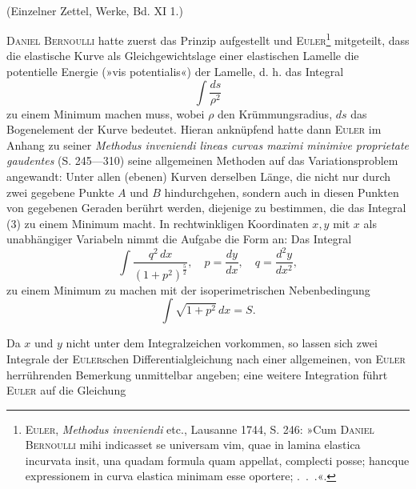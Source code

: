 \clearpage\begingroup\NoSourceHead{}
\renewcommand{\thefootnote}{\arabic{footnote})}\setcounter{footnote}{2}
\begin{center}\\
\small (Einzelner Zettel, Werke, Bd. XI 1.)\end{center}
\noindent\hspace*{\parindent}\textsc{Daniel Bernoulli} hatte zuerst das Prinzip aufgestellt und \textsc{Euler}\footnote{\textsc{Euler}, \textit{Methodus inveniendi} etc., Lausanne 1744, S. 246: »Cum \textsc{Daniel Bernoulli} mihi indicasset
se universam vim, quae in lamina elastica incurvata insit, una quadam formula quam 
appellat, complecti posse; hancque expressionem in curva elastica minimam esse oportere; .\ .\ .«.} mitgeteilt, dass die elastische Kurve als Gleichgewichtslage einer elastischen Lamelle die potentielle Energie (»vis potentialis«) der Lamelle, d. h. das Integral
\begin{equation*}\tag{3}
\int\frac{ds}{\rho^2}
\end{equation*}
zu einem Minimum machen muss, wobei $\rho$ den Krümmungsradius, $ds$ das
\clearpage{}
\noindent Bogenelement der Kurve bedeutet. Hieran anknüpfend hatte dann \textsc{Euler} im
Anhang zu seiner \textit{Methodus inveniendi lineas curvas maximi minimive proprietate
gaudentes} (S. 245—310) seine allgemeinen Methoden auf das Variationsproblem
angewandt: Unter allen (ebenen) Kurven derselben Länge, die nicht nur durch
zwei gegebene Punkte $A$ und $B$ hindurchgehen, sondern auch in diesen
Punkten von gegebenen Geraden berührt werden, diejenige zu bestimmen, die
das Integral (3) zu einem Minimum macht. In rechtwinkligen Koordinaten
$x,y$ mit $x$ als unabhängiger Variabeln nimmt die Aufgabe die Form an: Das
Integral
\[
\int\frac{q^2\,dx}{(1+p^2)^{\frac52}},\quad p=\frac{dy}{dx},\quad q=\frac{d^2y}{dx^2},
\]
zu einem Minimum zu machen mit der isoperimetrischen Nebenbedingung
\[
\int\sqrt{1+p^2}\,dx=S.
\]
\par\noindent\hspace*{\parindent}Da $x$ und $y$ nicht unter dem Integralzeichen vorkommen, so lassen sich
zwei Integrale der \textsc{Euler}schen Differentialgleichung nach einer allgemeinen,
von \textsc{Euler} herrührenden Bemerkung unmittelbar angeben; eine weitere Integration führt \textsc{Euler} auf die Gleichung
